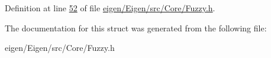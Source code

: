 Definition at line \hyperlink{eigen_2_eigen_2src_2_core_2_fuzzy_8h_source_l00052}{52} of file \hyperlink{eigen_2_eigen_2src_2_core_2_fuzzy_8h_source}{eigen/\+Eigen/src/\+Core/\+Fuzzy.\+h}.



The documentation for this struct was generated from the following file\+:\begin{DoxyCompactItemize}
\item 
eigen/\+Eigen/src/\+Core/\+Fuzzy.\+h\end{DoxyCompactItemize}
